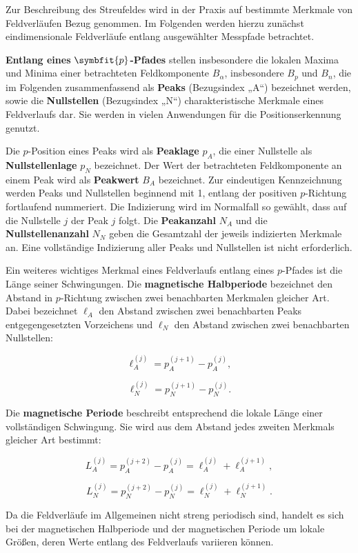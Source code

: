 \documentclass[
  ngerman,
  a4paper,
  twoside]{scrbook}
\begin{document}
Zur Beschreibung des Streufeldes wird in der Praxis auf bestimmte
Merkmale von Feldverläufen Bezug genommen. Im Folgenden werden hierzu
zunächst eindimensionale Feldverläufe entlang ausgewählter Messpfade
betrachtet.

\textbf{Entlang eines} \(\symbfit{p}\)\textbf{-Pfades} stellen
insbesondere die lokalen Maxima und Minima einer betrachteten
Feldkomponente \(B_\alpha\), insbesondere \(B_p\) und \(B_n\), die im
Folgenden zusammenfassend als \textbf{Peaks} (Bezugsindex „A``)
bezeichnet werden, sowie die \textbf{Nullstellen} (Bezugsindex „N``)
charakteristische Merkmale eines Feldverlaufs dar. Sie werden in vielen
Anwendungen für die Positionserkennung genutzt.

Die \(p\)-Position eines Peaks wird als \textbf{Peaklage} \(p_A\), die
einer Nullstelle als \textbf{Nullstellenlage} \(p_N\) bezeichnet. Der
Wert der betrachteten Feldkomponente an einem Peak wird als
\textbf{Peakwert} \(B_A\) bezeichnet. Zur eindeutigen Kennzeichnung
werden Peaks und Nullstellen beginnend mit 1, entlang der positiven
\(p\)-Richtung fortlaufend nummeriert. Die Indizierung wird im
Normalfall so gewählt, dass auf die Nullstelle \(j\) der Peak \(j\)
folgt. Die \textbf{Peakanzahl} \(N_A\) und die
\textbf{Nullstellenanzahl} \(N_N\) geben die Gesamtzahl der jeweils
indizierten Merkmale an. Eine vollständige Indizierung aller Peaks und
Nullstellen ist nicht erforderlich.

Ein weiteres wichtiges Merkmal eines Feldverlaufs entlang eines
\(p\)-Pfades ist die Länge seiner Schwingungen. Die \textbf{magnetische
Halbperiode} bezeichnet den Abstand in \(p\)-Richtung zwischen zwei
benachbarten Merkmalen gleicher Art. Dabei bezeichnet \(\ell_A\) den
Abstand zwischen zwei benachbarten Peaks entgegengesetzten Vorzeichens
und \(\ell_N\) den Abstand zwischen zwei benachbarten Nullstellen:

\[
\ell_A^{(j)} = p_A^{(j+1)} - p_A^{(j)},
\]

\[
\ell_N^{(j)} = p_N^{(j+1)} - p_N^{(j)}.
\]

Die \textbf{magnetische Periode} beschreibt entsprechend die lokale
Länge einer vollständigen Schwingung. Sie wird aus dem Abstand jedes
zweiten Merkmals gleicher Art bestimmt:

\[
L_A^{(j)} = p_A^{(j+2)} - p_A^{(j)}
= \ell_A^{(j)} + \ell_A^{(j+1)},
\]

\[
L_N^{(j)} = p_N^{(j+2)} - p_N^{(j)}
= \ell_N^{(j)} + \ell_N^{(j+1)}.
\]

Da die Feldverläufe im Allgemeinen nicht streng periodisch sind, handelt
es sich bei der magnetischen Halbperiode und der magnetischen Periode um
lokale Größen, deren Werte entlang des Feldverlaufs variieren können.
\end{document}
